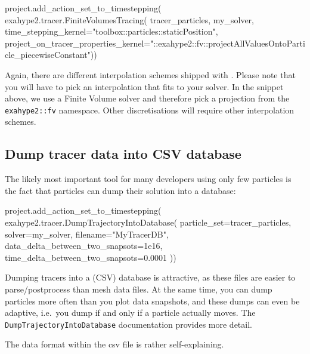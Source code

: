 \begin{code}
project.add_action_set_to_timestepping(
  exahype2.tracer.FiniteVolumesTracing(
    tracer_particles,
    my_solver,
    time_stepping_kernel="toolbox::particles::staticPosition",
    project_on_tracer_properties_kernel="::exahype2::fv::projectAllValuesOntoParticle_piecewiseConstant"))
\end{code}

\noindent
Again, there are different interpolation schemes shipped with \ExaHyPE.
Please note that you will have to pick an interpolation that fits to your
solver.
In the snippet above, we use a Finite Volume solver and therefore pick a
projection from the \texttt{exahype2::fv} namespace.
Other discretisations will require other interpolation schemes.


\subsection{Dump tracer data into CSV database}

The likely most important tool for many developers using only few particles is
the fact that particles can dump their solution into a database:

\begin{code}
project.add_action_set_to_timestepping( 
 exahype2.tracer.DumpTrajectoryIntoDatabase(
  particle_set=tracer_particles,
  solver=my_solver,
  filename="MyTracerDB",
  data_delta_between_two_snapsots=1e16,
  time_delta_between_two_snapsots=0.0001
))
\end{code}

\noindent
Dumping tracers into a (CSV) database is attractive, as these files are easier
to parse/postprocess than mesh data files. 
At the same time, you can dump particles more often than you plot data
snapshots, and these dumps can even be adaptive, i.e.~you dump if and only if a
particle actually moves.
The \texttt{DumpTrajectoryIntoDatabase} documentation provides more detail.


The data format within the csv file is rather self-explaining.

